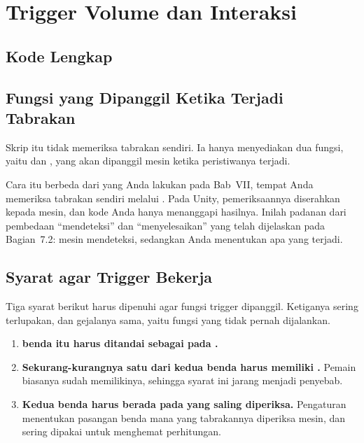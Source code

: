 \section{Trigger Volume dan Interaksi}
\label{sec:trigger}

\subsection{Kode Lengkap}


\subsection{Fungsi yang Dipanggil Ketika Terjadi Tabrakan}

Skrip itu tidak memeriksa tabrakan sendiri. Ia hanya
menyediakan dua fungsi, yaitu  dan
, yang akan dipanggil mesin ketika peristiwanya terjadi.

Cara itu berbeda dari yang Anda lakukan pada Bab~VII, tempat Anda memeriksa
tabrakan sendiri melalui . Pada Unity, pemeriksaannya
diserahkan kepada mesin, dan kode Anda hanya menanggapi hasilnya. Inilah
padanan dari pembedaan ``mendeteksi'' dan ``menyelesaikan'' yang telah
dijelaskan pada Bagian~7.2: mesin mendeteksi, sedangkan Anda menentukan apa
yang terjadi.

\subsection{Syarat agar Trigger Bekerja}

Tiga syarat berikut harus dipenuhi agar fungsi trigger dipanggil. Ketiganya
sering terlupakan, dan gejalanya sama, yaitu fungsi yang tidak pernah
dijalankan.

\begin{enumerate}
  \item \textbf{ benda itu harus ditandai sebagai
         pada .}
  \item \textbf{Sekurang-kurangnya satu dari kedua benda harus memiliki
        .} Pemain biasanya sudah memilikinya, sehingga
        syarat ini jarang menjadi penyebab.
  \item \textbf{Kedua benda harus berada pada  yang saling
        diperiksa.} Pengaturan  menentukan pasangan benda mana
        yang tabrakannya diperiksa mesin, dan sering dipakai untuk
        menghemat perhitungan.
\end{enumerate}

